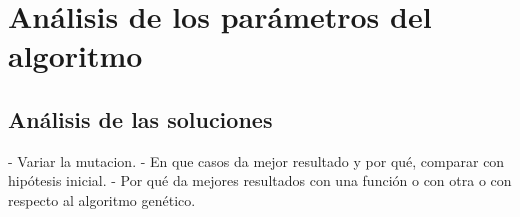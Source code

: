 \chapter{Análisis de los parámetros del algoritmo}







\section{Análisis de las soluciones}

- Variar la mutacion.
- En que casos da mejor resultado y por qué, comparar con hipótesis inicial.
- Por qué da mejores resultados con una función o con otra o con respecto al algoritmo genético.
